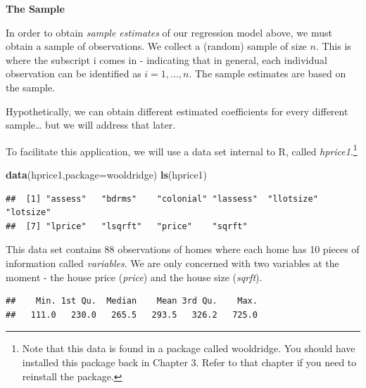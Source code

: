\documentclass[
]{book}
\newenvironment{Shaded}{\begin{snugshade}}{\end{snugshade}}
\newcommand{\AttributeTok}[1]{\textcolor[rgb]{0.13,0.29,0.53}{#1}}
\newcommand{\FunctionTok}[1]{\textcolor[rgb]{0.13,0.29,0.53}{\textbf{#1}}}
\newcommand{\NormalTok}[1]{#1}
\newcommand{\SpecialCharTok}[1]{\textcolor[rgb]{0.81,0.36,0.00}{\textbf{#1}}}
\newcommand{\StringTok}[1]{\textcolor[rgb]{0.31,0.60,0.02}{#1}}
\begin{document}
\textbf{The Sample}

In order to obtain \emph{sample estimates} of our regression model above, we must obtain a sample of observations. We collect a (random) sample of size \(n\). This is where the subscript i comes in - indicating that in general, each individual observation can be identified as \(i=1,...,n\). The sample estimates are based on the sample.

Hypothetically, we can obtain different estimated coefficients for every different sample\ldots{} but we will address that later.

To facilitate this application, we will use a data set internal to R, called \emph{hprice1}.\footnote{Note that this data is found in a package called wooldridge. You should have installed this package back in Chapter 3. Refer to that chapter if you need to reinstall the package.}

\begin{Shaded}
\begin{Highlighting}[]
\FunctionTok{data}\NormalTok{(hprice1,}\AttributeTok{package=}\StringTok{\textquotesingle{}wooldridge\textquotesingle{}}\NormalTok{)}
\FunctionTok{ls}\NormalTok{(hprice1)}
\end{Highlighting}
\end{Shaded}

\begin{verbatim}
##  [1] "assess"   "bdrms"    "colonial" "lassess"  "llotsize" "lotsize" 
##  [7] "lprice"   "lsqrft"   "price"    "sqrft"
\end{verbatim}

This data set contains 88 observations of homes where each home has 10 pieces of information called \emph{variables}. We are only concerned with two variables at the moment - the house price (\emph{price}) and the house size (\emph{sqrft}).

\begin{Shaded}
\end{Shaded}

\begin{verbatim}
##    Min. 1st Qu.  Median    Mean 3rd Qu.    Max. 
##   111.0   230.0   265.5   293.5   326.2   725.0
\end{verbatim}

\begin{Shaded}
\end{Shaded}
\end{document}
